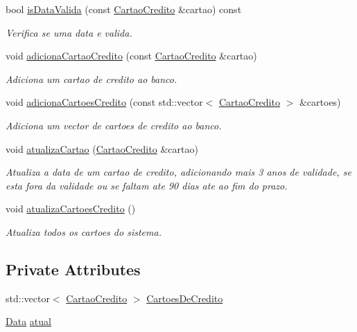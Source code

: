 \begin{DoxyCompactItemize}
bool \mbox{\hyperlink{class_banco_ac469cc9db5980081701bf9eb27a7e612}{is\+Data\+Valida}} (const \mbox{\hyperlink{class_cartao_credito}{Cartao\+Credito}} \&cartao) const
\begin{DoxyCompactList}\small\item\em Verifica se uma data e valida. \end{DoxyCompactList}\item 
void \mbox{\hyperlink{class_banco_a2ac1bb3c6a742743bcbb6dd0a312d74d}{adiciona\+Cartao\+Credito}} (const \mbox{\hyperlink{class_cartao_credito}{Cartao\+Credito}} \&cartao)
\begin{DoxyCompactList}\small\item\em Adiciona um cartao de credito ao banco. \end{DoxyCompactList}\item 
void \mbox{\hyperlink{class_banco_a5f36ab07909fc570d158a21e2e6398f5}{adiciona\+Cartoes\+Credito}} (const std\+::vector$<$ \mbox{\hyperlink{class_cartao_credito}{Cartao\+Credito}} $>$ \&cartoes)
\begin{DoxyCompactList}\small\item\em Adiciona um vector de cartoes de credito ao banco. \end{DoxyCompactList}\item 
void \mbox{\hyperlink{class_banco_a8c8f743903ba86129b62afbb3813e6f0}{atualiza\+Cartao}} (\mbox{\hyperlink{class_cartao_credito}{Cartao\+Credito}} \&cartao)
\begin{DoxyCompactList}\small\item\em Atualiza a data de um cartao de credito, adicionando mais 3 anos de validade, se esta fora da validade ou se faltam ate 90 dias ate ao fim do prazo. \end{DoxyCompactList}\item 
void \mbox{\hyperlink{class_banco_ad6f39d091c83361878bc5cfda534a49d}{atualiza\+Cartoes\+Credito}} ()
\begin{DoxyCompactList}\small\item\em Atualiza todos os cartoes do sistema. \end{DoxyCompactList}\end{DoxyCompactItemize}
\subsection*{Private Attributes}
\begin{DoxyCompactItemize}
\item 
std\+::vector$<$ \mbox{\hyperlink{class_cartao_credito}{Cartao\+Credito}} $>$ \mbox{\hyperlink{class_banco_a45e7c51b2a5e58a357367a49eabd15e5}{Cartoes\+De\+Credito}}
\item 
\mbox{\hyperlink{class_data}{Data}} \mbox{\hyperlink{class_banco_a8a183cd204373487207a7a7f2e8298ba}{atual}}
\end{DoxyCompactItemize}


